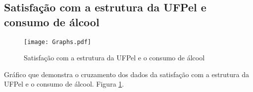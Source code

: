 \documentclass[11pt]{scrartcl} %
\begin{document}
\clearpage

\subsection{Satisfação com a estrutura da UFPel e consumo de álcool}

\begin{figure}[h]
  \centering
  \texttt{[image: Graphs.pdf]}
  \label{fig:graph13}
  \caption{Satisfação com a estrutura da UFPel e o consumo de álcool}
\end{figure}

Gráfico que demonstra o cruzamento dos dados da satisfação com a estrutura da UFPel e o consumo de álcool. Figura \ref{fig:graph13}.
\end{document}
